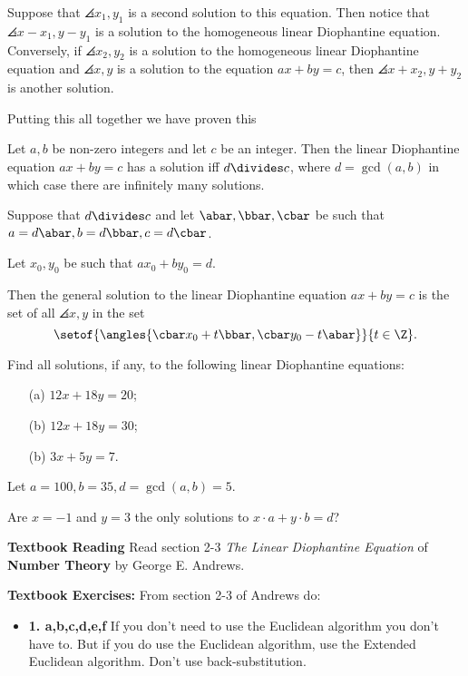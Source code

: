 \documentclass[oneside,12pt]{amsart}
\begin{document}
Suppose that $\angles{x_1,y_1}$ is a second solution to this equation. Then notice that
$\angles{x-x_1,y-y_1}$ is a solution to the homogeneous linear Diophantine equation. Conversely,
if $\angles{x_2,y_2}$ is a solution to the homogeneous linear Diophantine equation and
$\angles{x,y}$ is a solution to the equation $ax+by=c$, then
$\angles{x+x_2, y+y_2}$ is another solution.

Putting this all together we have proven this

\begin{theorem}
Let $a,b$ be non-zero integers and let $c$ be an integer. Then the linear Diophantine equation
$ax+by=c$ has a solution iff $d\divides c$, where $d=\gcd(a,b)$ in which case there are infinitely
many solutions.

Suppose that $d\divides c$ and let $\abar,\bbar, \cbar$ be such that $a=d\abar, b=d\bbar, c=d\cbar$.

Let $x_0,y_0$ be such that $a x_0 + b y_0 = d$.

Then the general solution to the linear Diophantine equation $ax+by=c$ is the set of all
$\angles{x,y}$ in the set
$$\setof{\angles{\cbar x_0 + t\bbar, \cbar y_0 - t\abar}}{t\in\Z}.$$
\end{theorem}

\begin{in_class_example}
Find all solutions, if any, to the following linear Diophantine equations:
\begin{itemize}
\item[(a)] $12x + 18y = 20$;
\item[(b)] $12x + 18y = 30$;
\item[(b)] $3x + 5y = 7$.
\end{itemize}
\end{in_class_example}

\begin{in_class_example}
Let $a=100, b=35, d=\gcd(a,b)=5$.


Are $x=-1$ and $y=3$ the only solutions to $x\cdot a + y\cdot b = d$?

\end{in_class_example}

\bigskip

\textbf{Textbook Reading} Read section 2-3 \emph{The Linear Diophantine Equation} of 
\textbf{Number Theory} by George E. Andrews.

\bigskip

\textbf{Textbook Exercises:} From section 2-3 of Andrews do:
\begin{itemize}
\item \textbf{1. a,b,c,d,e,f} If you don't need to use the Euclidean algorithm you don't have to. But if you
do use the Euclidean algorithm, use the Extended Euclidean algorithm. Don't use back-substitution.
\end{itemize}
\end{document}
